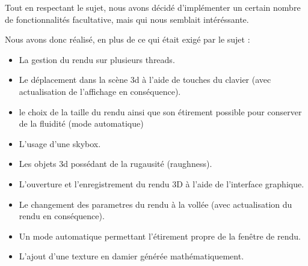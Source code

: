 Tout en respectant le sujet, nous avons décidé d'implémenter un certain nombre de fonctionnalités facultative, mais qui nous semblait intéréssante.

Nous avons donc réalisé, en plus de ce qui était exigé par le sujet :
\begin{itemize}
    \item La gestion du rendu sur plusieurs threads.
    \item Le déplacement dans la scène 3d à l'aide de touches du clavier (avec actualisation de l'affichage en conséquence).
    \item le choix de la taille du rendu ainsi que son étirement possible pour conserver de la fluidité (mode automatique)
    \item L'usage d'une skybox.
    \item Les objets 3d possédant de la rugausité (raughness).
    \item L'ouverture et l'enregistrement du rendu 3D à l'aide de l'interface graphique.
    \item Le changement des parametres du rendu à la vollée (avec actualisation du rendu en conséquence).
    \item Un mode automatique permettant l'étirement propre de la fenêtre de rendu.
    \item L'ajout d'une texture en damier générée mathématiquement.
\end{itemize}
